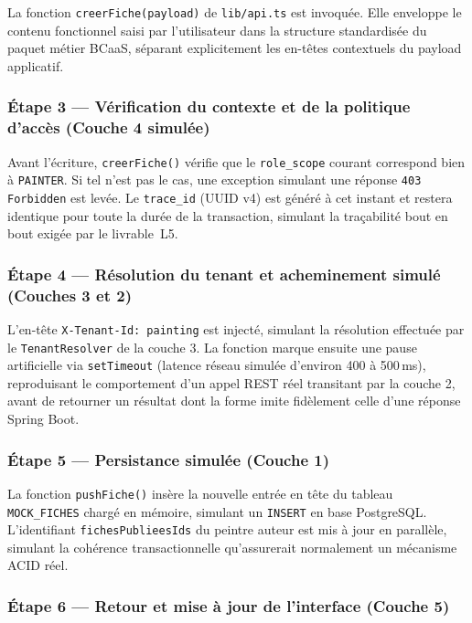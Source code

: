 \documentclass[12pt,a4paper]{report}
\begin{document}
La fonction \texttt{creerFiche(payload)} de \texttt{lib/api.ts} est invoquée. Elle enveloppe le contenu fonctionnel saisi par l'utilisateur dans la structure standardisée du paquet métier BCaaS, séparant explicitement les en-têtes contextuels du payload applicatif.

\subsubsection*{Étape 3 --- Vérification du contexte et de la politique d'accès (Couche 4 simulée)}

Avant l'écriture, \texttt{creerFiche()} vérifie que le \texttt{role\_scope} courant correspond bien à \texttt{PAINTER}. Si tel n'est pas le cas, une exception simulant une réponse \texttt{403 Forbidden} est levée. Le \texttt{trace\_id} (UUID v4) est généré à cet instant et restera identique pour toute la durée de la transaction, simulant la traçabilité bout en bout exigée par le livrable~L5.

\subsubsection*{Étape 4 --- Résolution du tenant et acheminement simulé (Couches 3 et 2)}

L'en-tête \texttt{X-Tenant-Id: painting} est injecté, simulant la résolution effectuée par le \texttt{TenantResolver} de la couche 3. La fonction marque ensuite une pause artificielle via \texttt{setTimeout} (latence réseau simulée d'environ 400 à 500\,ms), reproduisant le comportement d'un appel REST réel transitant par la couche 2, avant de retourner un résultat dont la forme imite fidèlement celle d'une réponse Spring Boot.

\subsubsection*{Étape 5 --- Persistance simulée (Couche 1)}

La fonction \texttt{pushFiche()} insère la nouvelle entrée en tête du tableau \texttt{MOCK\_FICHES} chargé en mémoire, simulant un \texttt{INSERT} en base PostgreSQL. L'identifiant \texttt{fichesPublieesIds} du peintre auteur est mis à jour en parallèle, simulant la cohérence transactionnelle qu'assurerait normalement un mécanisme ACID réel.

\subsubsection*{Étape 6 --- Retour et mise à jour de l'interface (Couche 5)}
\end{document}
